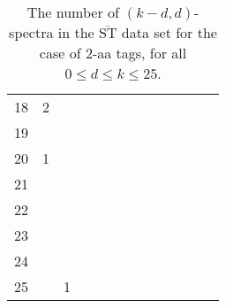 \documentclass{article}
\def\STbar{{\overline{\mathrm{ST}}}}
\begin{document}
\begin{table}[h]
{\begin{tabular}{|c|c|
c|c|c|c|c|c|c|c|c|c|c|}
18  & 2 &  &  &  &  &  &  &  &  &  &  & \\

19  &  &  &  &  &  &  &  &  &  &  &  & \\

20  & 1 &  &  &  &  &  &  &  &  &  &  & \\

21  &  &  &  &  &  &  &  &  &  &  &  & \\

22  &  &  &  &  &  &  &  &  &  &  &  & \\

23  &  &  &  &  &  &  &  &  &  &  &  & \\

24  &  &  &  &  &  &  &  &  &  &  &  & \\

25  &  & 1 &  &  &  &  &  &  &  &  &  & \\

  \hline
\end{tabular}
\par}
\centering
\caption{The number of $(k-d,d)$-spectra in the $\STbar$ data set for the case of 2-aa tags, for all $0\le d\le k\le 25$.}
\vspace{3mm}
\label{table:kd-1-ST}
\end{table}
\end{document}
